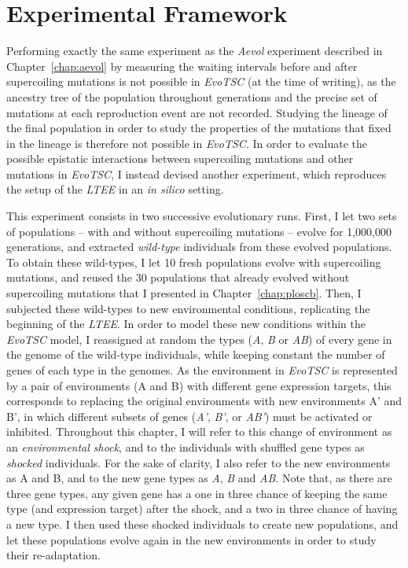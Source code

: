 \section{Experimental Framework}

Performing exactly the same experiment as the \emph{Aevol} experiment described in Chapter~\ref{chap:aevol} by measuring the waiting intervals before and after supercoiling mutations is not possible in \emph{EvoTSC} (at the time of writing), as the ancestry tree of the population throughout generations and the precise set of mutations at each reproduction event are not recorded.
Studying the lineage of the final population in order to study the properties of the mutations that fixed in the lineage is therefore not possible in \emph{EvoTSC}.
In order to evaluate the possible epistatic interactions between supercoiling mutations and other mutations in \emph{EvoTSC}, I instead devised another experiment, which reproduces the setup of the \emph{LTEE} in an \emph{in silico} setting.

This experiment consists in two successive evolutionary runs.
First, I let two sets of populations -- with and without supercoiling mutations -- evolve for 1,000,000 generations, and extracted \emph{wild-type} individuals from these evolved populations.
To obtain these wild-types, I let 10 fresh populations evolve with supercoiling mutations, and reused the 30 populations that already evolved without supercoiling mutations that I presented in Chapter~\ref{chap:ploscb}.
Then, I subjected these wild-types to new environmental conditions, replicating the beginning of the \emph{LTEE}.
In order to model these new conditions within the \emph{EvoTSC} model, I reassigned at random the types (\emph{A}, \emph{B} or \emph{AB}) of every gene in the genome of the wild-type individuals, while keeping constant the number of genes of each type in the genomes.
As the environment in \emph{EvoTSC} is represented by a pair of environments (A and B) with different gene expression targets, this corresponds to replacing the original environments with new environments A' and B', in which different subsets of genes (\emph{A'}, \emph{B'}, or \emph{AB'}) must be activated or inhibited.
Throughout this chapter, I will refer to this change of environment as an \emph{environmental shock}, and to the individuals with shuffled gene types as \emph{shocked} individuals.
For the sake of clarity, I also refer to the new environments as A and B, and to the new gene types as \emph{A}, \emph{B} and \emph{AB}.
Note that, as there are three gene types, any given gene has a one in three chance of keeping the same type (and expression target) after the shock, and a two in three chance of having a new type.
I then used these shocked individuals to create new populations, and let these populations evolve again in the new environments in order to study their re-adaptation.

